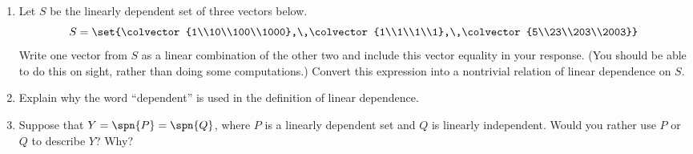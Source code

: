 \begin{enumerate}
%
\item Let  $S$  be the linearly dependent set of three vectors below.
%
\begin{equation*}
S=\set{\colvector{1\\10\\100\\1000},\,\colvector{1\\1\\1\\1},\,\colvector{5\\23\\203\\2003}}
\end{equation*}
%
Write one vector from $S$ as a linear combination of the other two and include this vector equality in your response.  (You should be able to do this on sight, rather than doing some computations.)  Convert this expression into a nontrivial relation of linear dependence on $S$.
%
\item  Explain why the word ``dependent'' is used in the definition of linear dependence.
%
\item Suppose that $Y=\spn{P}=\spn{Q}$, where $P$ is a linearly dependent set and $Q$ is linearly independent.  Would you rather use $P$ or $Q$ to describe $Y$?  Why?
%
\end{enumerate}

